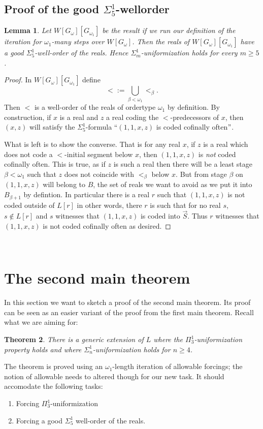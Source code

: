 \documentclass[a4paper,11pt]{article}
\newtheorem{theorem}{Theorem}[section]
\newtheorem{lemma}[theorem]{Lemma}
\begin{document}
\subsection{Proof of the good \texorpdfstring{$\Sigma^1_5$}{Sigma15}-wellorder}


\begin{lemma}
Let $W[G_{\omega}] [G_{\omega_1}]$ be the result if we run our definition of the iteration for $\omega_1$-many steps over $W[G_{\omega}]$.
Then the reals of $W[G_{\omega}] [G_{\omega_1}]$ have a good $\Sigma^1_5$-well-order of the reals. Hence $\Sigma^1_m$-uniformization holds for every $m \ge 5$.

\end{lemma}
\begin{proof}
In $W[G_{\omega}][G_{\omega_1}]$ define \[ < :=\bigcup_{\beta < \omega_1} <_{\beta}. \]
Then $<$ is a well-order of the reals of ordertype $\omega_1$ by definition.  By construction, if $x$ is a real and $z$ a real coding the $<$-predecessors of $x$, then $(x,z)$ will satisfy the $\Sigma^1_5$-formula
``$(1,1,x,z)$ is coded cofinally often$"$. 


What is left is to show the converse. That is for any real $x$, if $z$ is a real which does not code a $<$-initial segment below $x$, then $(1,1,x,z)$ is \emph{not} coded cofinally often. This is true, as if $z$ is such a real then there will be a least stage $\beta <\omega_1$ such that
$z$ does not coincide with $<_{\beta}$ below $x$. But from stage $\beta$ on $(1,1,x,z)$ will belong to $B$, the set of reals we want to avoid as we put it into $B_{\beta+1}$ by defintion. In particular there is a real $r$ such that $(1,1,x,z)$ is not coded outside of $L[r]$ in other words, there $r$ is such that for no real $s$, $ s \notin L[r]$ and $s$ witnesses that $(1,1,x,z)$ is coded into $\vec{S}$. Thus $r$ witnesses that $(1,1,x,z)$ is not coded cofinally often as desired.



\end{proof}
    ﻿
    ﻿\section{The second main theorem}
In this section we want to sketch a proof of the second main theorem. Its proof can be seen as an easier variant of the proof from the first main theorem.
Recall what we are aiming for:
\begin{theorem}
There is a generic extension of $L$ where the
$\Pi^1_3$-uniformization property holds and where $\Sigma^1_n$-uniformization holds for $n \ge 4$.
\end{theorem}
The theorem is proved using an $\omega_1$-length iteration of allowable forcings; the notion of allowable needs to altered though for our new task. It should accomodate the following tasks:
\begin{enumerate}
\item Forcing $\Pi^1_3$-uniformization

\item Forcing a good $\Sigma^1_5$ well-order of the reals.
\end{enumerate}
\end{document}
